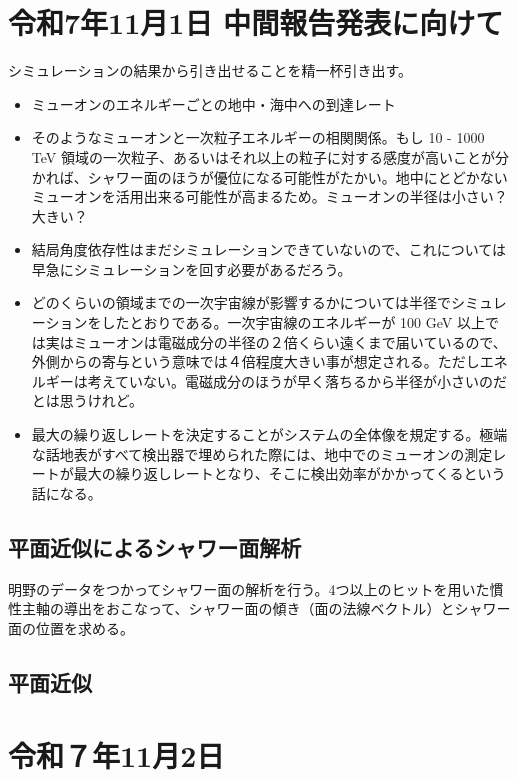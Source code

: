
\section{令和7年11月1日 中間報告発表に向けて}

シミュレーションの結果から引き出せることを精一杯引き出す。
\begin{itemize}
  \item ミューオンのエネルギーごとの地中・海中への到達レート
  \item そのようなミューオンと一次粒子エネルギーの相関関係。もし 10 - 1000 TeV 領域の一次粒子、あるいはそれ以上の粒子に対する感度が高いことが分かれば、シャワー面のほうが優位になる可能性がたかい。地中にとどかないミューオンを活用出来る可能性が高まるため。ミューオンの半径は小さい？大きい？
  \item 結局角度依存性はまだシミュレーションできていないので、これについては早急にシミュレーションを回す必要があるだろう。
  \item どのくらいの領域までの一次宇宙線が影響するかについては半径でシミュレーションをしたとおりである。一次宇宙線のエネルギーが 100 GeV 以上では実はミューオンは電磁成分の半径の２倍くらい遠くまで届いているので、外側からの寄与という意味では４倍程度大きい事が想定される。ただしエネルギーは考えていない。電磁成分のほうが早く落ちるから半径が小さいのだとは思うけれど。
  \item 最大の繰り返しレートを決定することがシステムの全体像を規定する。極端な話地表がすべて検出器で埋められた際には、地中でのミューオンの測定レートが最大の繰り返しレートとなり、そこに検出効率がかかってくるという話になる。
\end{itemize}

\subsection{平面近似によるシャワー面解析}

明野のデータをつかってシャワー面の解析を行う。4つ以上のヒットを用いた慣性主軸の導出をおこなって、シャワー面の傾き（面の法線ベクトル）とシャワー面の位置を求める。


\subsection{平面近似}

\section{令和７年11月2日}

